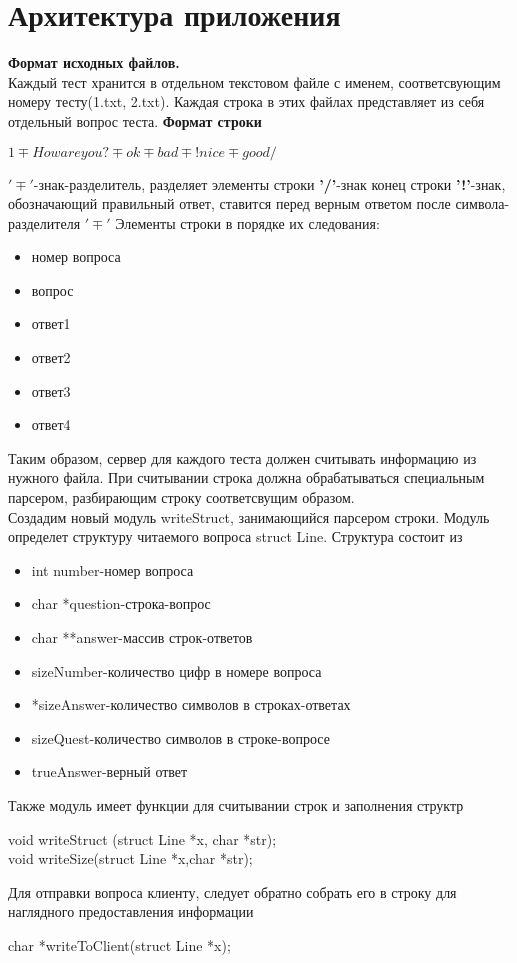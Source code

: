 \documentclass[12pt,a4paper]{report}
\begin{document}
\section{Архитектура приложения}
\textbf{Формат исходных файлов.}\\
Каждый тест хранится в отдельном текстовом файле с именем, соответсвующим номеру тесту(1.txt, 2.txt).
Каждая строка в этих файлах представляет из себя отдельный вопрос теста. \newline
\textbf{Формат строки}\newline 
\begin{center}
$1\mp How are you?\mp ok \mp bad \mp !nice \mp good/$
\end{center}
\textbf{$'\mp'$}-знак-разделитель, разделяет элементы строки\newline
\textbf{'/'}-знак конец строки\newline
\textbf{'!'}-знак, обозначающий правильный ответ, ставится перед верным ответом после символа-разделителя \textbf{$'\mp'$} \newline
Элементы строки в порядке их следования:
\begin{itemize}
\item{номер вопроса}
\item{вопрос}
\item{ответ1}
\item{ответ2}
\item{ответ3} 
\item{ответ4}
\end{itemize}
Таким образом, сервер для каждого теста должен считывать информацию из нужного файла. При считывании строка должна обрабатываться специальным парсером, разбирающим строку соответсвущим образом.\\
Создадим новый модуль writeStruct, занимающийся парсером строки. Модуль определет структуру читаемого вопроса struct Line. Структура состоит из
\begin{itemize}
\item{int number-номер вопроса}
\item{char *question-строка-вопрос}
\item{char **answer-массив строк-ответов}
\item{sizeNumber-количество цифр в номере вопроса}
\item{*sizeAnswer-количество символов в строках-ответах} 
\item{sizeQuest-количество символов в строке-вопросе}
\item{trueAnswer-верный ответ}
\end{itemize}
Также модуль имеет функции для считывании строк и заполнения структр\\
\begin{center}
void writeStruct (struct Line *x, char *str);\\
void writeSize(struct Line *x,char *str);\\
\end{center}
Для отправки вопроса клиенту, следует обратно собрать его в строку для наглядного предоставления информации\\
\begin{center} 
char *writeToClient(struct Line *x);\\
\end{center}
\end{document}
